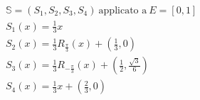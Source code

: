 \documentclass[preview]{standalone}
\begin{document}
\begin{align*}
& \mathbb{S} = (S_1,S_2,S_3,S_4) \ \text{applicato a} \ E = [0,1] \\ & S_1(x)=\textstyle\frac{1}{3}x \\ & S_2(x)=\textstyle\frac{1}{3}R_{\frac{\pi}{3}}(x) + \left(\textstyle\frac{1}{3},0\right) \\ & S_3(x)=\textstyle\frac{1}{3}R_{-\frac{\pi}{3}}(x) + \left(\textstyle\frac{1}{2},\textstyle\frac{\sqrt{3}}{6}\right) \\ & S_4(x)=\textstyle\frac{1}{3}x + \left(\textstyle\frac{2}{3},0\right)
\end{align*}
\end{document}
